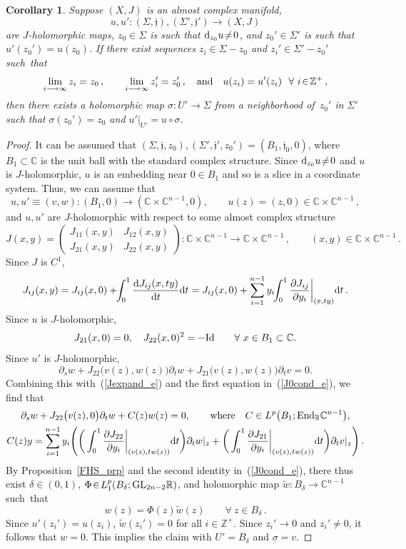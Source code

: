 \documentclass[11pt]{article}
\numberwithin{equation}{section}
\newtheorem{crl}[thm]{Corollary}
\theoremstyle{definition}
\def\BE#1{\begin{equation}\label{#1}}
\def\EE{\end{equation}}
\def\eref#1{(\ref{#1})}
\def\wt#1{\widetilde{#1}}
\def\lra{\longrightarrow}
\def\C{\mathbb{C}}
\def\fj{\mathfrak j}
\def\R{\mathbb R}
\def\Z{{\mathbb Z}}
\def\de{\delta}
\def\si{\sigma}
\def\Si{\Sigma}
\def\i{\infty}
\def\prt{\partial}
\def\End{\textnormal{End}}
\def\GL{\textnormal{GL}}
\def\Id{\textnormal{Id}}
\def\nd{\textnormal{d}}
\begin{document}
\begin{crl}\label{FHS_crl2b}
Suppose $(X,J)$ is an almost complex manifold, 
$$u,u'\!:(\Si,\fj),(\Si',\fj')\lra (X,J)$$
are $J$-holomorphic maps,
$z_0\!\in\!\Si$ is such that $\nd_{z_0}u\!\neq\!0$,
and $z_0'\!\in\!\Si'$ is such that $u'(z_0')\!=\!u(z_0)$.
If there exist sequences $z_i\!\in\!\Si\!-\!z_0$ and $z_i'\!\in\!\Si'\!-\!z_0'$
such~that 
$$\lim_{i\lra\i}z_i=z_0\,, \qquad \lim_{i\lra\i}z_i'=z_0'\,, 
\quad\hbox{and}\quad u(z_i)=u'(z_i)~~\forall~i\!\in\!\Z^+\,,$$
then there exists a holomorphic map $\si\!:U'\!\lra\!\Si$ from a neighborhood
of~$z_0'$ in $\Si'$ such that $\si(z_0')\!=\!z_0$ and $u'|_{U'}\!=\!u\!\circ\!\si$.
\end{crl}

\begin{proof}
It can be assumed that $(\Si,\fj,z_0),(\Si',\fj',z_0')\!=\!(B_1,\fj_0,0)$,
where $B_1\!\subset\!\C$ is the unit ball with the standard complex structure.
Since $\nd_{z_0}u\!\neq\!0$ and $u$ is $J$-holomorphic, 
$u$ is an embedding near $0\!\in\!B_1$ and so is a slice in a coordinate system.
Thus, we can assume that 
$$u,u'\!\equiv\!(v,w)\!: (B_1,0)\lra (\C\!\times\!\C^{n-1},0),
\qquad u(z)=(z,0)\in\C\!\times\!\C^{n-1}\,,$$
and $u,u'$ are $J$-holomorphic with respect to some almost complex structure
$$J(x,y)=\left(\begin{array}{cc}J_{11}(x,y)& J_{12}(x,y)\\ 
J_{21}(x,y)& J_{22}(x,y)\end{array}\right)\!: \C\!\times\!\C^{n-1}\lra\C\!\times\!\C^{n-1}\,,
\qquad (x,y)\in\C\!\times\!\C^{n-1}\,.$$
Since $J$ is $C^1$,
\BE{Jexpand_e}J_{ij}(x,y)=J_{ij}(x,0)+\!\!\int_0^1\frac{\nd J_{ij}(x,ty)}{\nd t}\nd t
=J_{ij}(x,0)+\sum_{i=1}^{n-1}y_i\!\!
\int_0^1\frac{\prt J_{ij}}{\prt y_i}\bigg|_{(x,ty)}\nd t\,.\EE
Since $u$ is $J$-holomorphic,
\BE{J0cond_e} J_{21}(x,0)=0,\quad J_{22}(x,0)^2=-\Id \qquad\forall~x\in B_1\subset\C.\EE
Since $u'$ is $J$-holomorphic,
$$ \prt_s w + J_{22}\big(v(z),w(z)\big)\prt_t w
+J_{21}\big(v(z),w(z)\big)\prt_t v=0.$$
Combining this with~\eref{Jexpand_e} and the first equation in~\eref{J0cond_e},
we find that 
\begin{gather*}
\prt_s w + J_{22}\big(v(z),0\big)\prt_t w+C(z)w(z)=0, \qquad\hbox{where}\quad
C\in L^p\big(B_1;\End_{\R}\C^{n-1}\big),\\
C(z)y=\sum_{i=1}^{n-1}y_i\Bigg(
\bigg(\int_0^1\frac{\prt J_{22}}{\prt y_i}\bigg|_{(v(z),tw(z))}\nd t\bigg)\prt_tw|_z
+\bigg(\int_0^1\frac{\prt J_{21}}{\prt y_i}\bigg|_{(v(z),tw(z))}\nd t\bigg)\prt_tv|_z\Bigg)\,.
\end{gather*}
By Proposition~\ref{FHS_prp} and the second identity in~\eref{J0cond_e}, 
there thus exist $\de\!\in\!(0,1)$, \hbox{$\Phi\!\in\!L^p_1(B_{\de};\GL_{2n-2}\R)$},
and holomorphic map $\wt{w}\!:B_{\de}\!\lra\!\C^{n-1}$ such~that 
$$w(z)=\Phi(z)\wt{w}(z) \qquad\forall~z\in B_{\de}\,.$$
Since \hbox{$u'(z_i')\!=\!u(z_i)$}, $\wt{w}(z_i')\!=\!0$ for all $i\!\in\!\Z^+$.
Since $z_i'\!\lra\!0$ and $z_i'\!\neq\!0$, it follows that $w\!=\!0$.
This implies the claim with $U'\!=\!B_{\de}$ and $\si\!=\!v$.
\end{proof}
\end{document}
